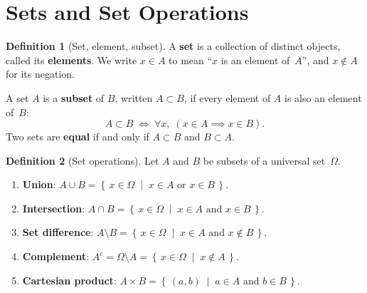 \documentclass[12pt,a4paper,openany]{book}
\newcommand{\setcond}[2]{\left\{\,#1\;\middle|\;#2\,\right\}}
\theoremstyle{definition}
\newtheorem{definition}{Definition}[chapter]
\theoremstyle{remark}
\begin{document}
\section{Sets and Set Operations}
\label{sec:sets}

\begin{definition}[Set, element, subset]\label{def:set}
A \textbf{set} is a collection of distinct objects, called its
\textbf{elements}.  We write $x \in A$ to mean ``$x$ is an
element of~$A$'', and $x \notin A$ for its negation.

A set $A$ is a \textbf{subset} of $B$, written $A \subset B$,
if every element of $A$ is also an element of~$B$:
\[
  A \subset B \;\iff\; \forall x,\; (x \in A \implies x \in B).
\]
Two sets are \textbf{equal} if and only if $A \subset B$ and $B \subset A$.
\end{definition}

\begin{definition}[Set operations]\label{def:set-operations}
Let $A$ and $B$ be subsets of a universal set~$\Omega$.
\begin{enumerate}[label=(\roman*)]
  \item \textbf{Union}: $A \cup B = \setcond{x \in \Omega}{x
    \in A \text{ or } x \in B}$.
  \item \textbf{Intersection}: $A \cap B =
    \setcond{x \in \Omega}{x \in A \text{ and } x \in B}$.
  \item \textbf{Set difference}: $A \setminus B =
    \setcond{x \in \Omega}{x \in A \text{ and } x \notin B}$.
  \item \textbf{Complement}: $A^c = \Omega \setminus A =
    \setcond{x \in \Omega}{x \notin A}$.
  \item \textbf{Cartesian product}: $A \times B =
    \setcond{(a,b)}{a \in A \text{ and } b \in B}$.
\end{enumerate}
\end{definition}

\medskip
\end{document}
